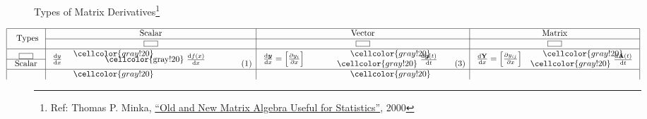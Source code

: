 \documentclass[12pt,thmsa]{article}
\newcommand{\vcenteredbox}[1]{%
	\begingroup
	\setbox0=\hbox{#1}%
	\parbox{\wd0}{\box0}%
	\endgroup
}
\begin{document}
\begin{center}
	Types of Matrix Derivatives\footnote{Ref: Thomas P. Minka, \href{https://tminka.github.io/papers/matrix/minka-matrix.pdf}{``Old and New Matrix Algebra Useful for Statistics''}, 2000}
\end{center}
\[
\noindent\hspace*{-1.2cm}%
\begin{aligned}
	\begin{array}{|c|cl|cc|cc|}
		\hline
		\multirow{2}{*}{ \text { Types }} 
			& \multicolumn{2}{c|}{\text{Scalar}} 
			& \multicolumn{2}{c|}{\text{Vector}} 
			& \multicolumn{2}{c|}{\text{Matrix}} \\  %
		\cline{2-7} 
		{}	
			&  \multicolumn{2}{c|}{ \vcenteredbox{\fbox{\vspace{1em}\hspace{1em}}} } 
			& \multicolumn{2}{c|}{ \vcenteredbox{\fbox{\vspace{1em}\hspace{1em}}} } 
			& \multicolumn{2}{c|}{ \vcenteredbox{\fbox{\vspace{1em}\hspace{1em}}} } \\ %
		\hline
		\fbox{\vspace{1em}\hspace{1em}}
			& \multirow{2}{*}{ \( \frac{\mathrm{d} y}{\mathrm{d} x} \) }  
			& \cellcolor{gray!20}
			& \multirow{2}{*}{ 
					\( \frac{\mathrm{d} \boldsymbol{y}}{\mathrm{d} x}=\left[\frac{\partial y_i}{\partial x}\right] \) 
				}
			& \cellcolor{gray!20} 
			& \multirow{2}{*}{ 
				\(\frac{\mathrm{d} \mathbf{Y}}{\mathrm{d} x}=\left[\frac{\partial y_{i j}}{\partial x}\right]\)} 
			& \cellcolor{gray!20} \\  %
		\cline{1-1} 
		\text{Scalar} 
			& 
			& \hspace{1.2cm} \multirow{-2}{*}{ \cellcolor{gray!20}
				\( \frac{\mathrm{d} f(x)}{\mathrm{d} x} \)}  \hspace{1.5cm} (1)
			& 
			& \hspace{0.9cm} \cellcolor{gray!20} \multirow{-2}{*}{ 
				\( \frac{\mathrm{d}  \boldsymbol{g}(t)}{\mathrm{d} t} \) 
			}  \hspace{0.6cm} (3) 
			&  
			& \cellcolor{gray!20} \multirow{-2}{*}{ 
				\(\frac{\mathrm{d}  \mathbf{A}(t)}{\mathrm{d} t}\) 
			} \\  %
		\hline 
		{}
			& 
			& \cellcolor{gray!20}
 			&
 			& \cellcolor{gray!20} 
 			& 
 			& \\  %

\end{array}
\end{aligned}\]
\end{document}

